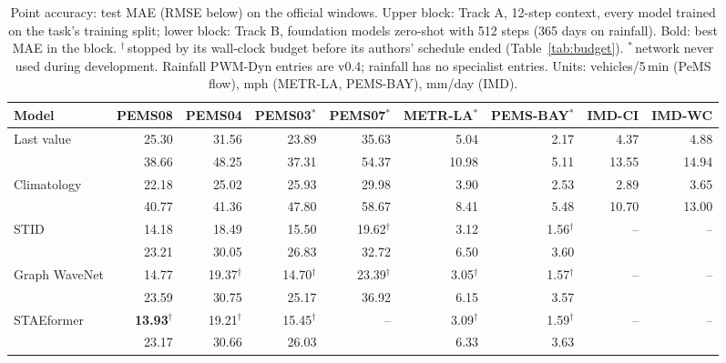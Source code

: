 \begin{table}[t]
\caption{Point accuracy: test MAE (RMSE below) on the official windows. Upper block: Track A, 12-step context, every model trained on the task's training split; lower block: Track B, foundation models zero-shot with 512 steps (365 days on rainfall). Bold: best MAE in the block. $^\dagger$\,stopped by its wall-clock budget before its authors' schedule ended (Table~\ref{tab:budget}). $^\ast$\,network never used during development. Rainfall PWM-Dyn entries are v0.4; rainfall has no specialist entries. Units: vehicles/5\,min (PeMS flow), mph (METR-LA, PEMS-BAY), mm/day (IMD).}
\label{tab:main}
\small
\setlength{\tabcolsep}{4pt}
\begin{tabular}{@{}lrrrrrrrr@{}}
\toprule
Model & PEMS08 & PEMS04 & PEMS03$^\ast$ & PEMS07$^\ast$ & METR-LA$^\ast$ & PEMS-BAY$^\ast$ & IMD-CI & IMD-WC \\
\midrule
Last value & 25.30 & 31.56 & 23.89 & 35.63 & 5.04 & 2.17 & 4.37 & 4.88 \\
 & {\scriptsize 38.66} & {\scriptsize 48.25} & {\scriptsize 37.31} & {\scriptsize 54.37} & {\scriptsize 10.98} & {\scriptsize 5.11} & {\scriptsize 13.55} & {\scriptsize 14.94} \\[1pt]
Climatology & 22.18 & 25.02 & 25.93 & 29.98 & 3.90 & 2.53 & 2.89 & 3.65 \\
 & {\scriptsize 40.77} & {\scriptsize 41.36} & {\scriptsize 47.80} & {\scriptsize 58.67} & {\scriptsize 8.41} & {\scriptsize 5.48} & {\scriptsize 10.70} & {\scriptsize 13.00} \\[1pt]
\midrule
STID & 14.18 & 18.49 & 15.50 & 19.62$^\dagger$ & 3.12 & 1.56$^\dagger$ & -- & -- \\
 & {\scriptsize 23.21} & {\scriptsize 30.05} & {\scriptsize 26.83} & {\scriptsize 32.72} & {\scriptsize 6.50} & {\scriptsize 3.60} &  &  \\[1pt]
Graph WaveNet & 14.77 & 19.37$^\dagger$ & 14.70$^\dagger$ & 23.39$^\dagger$ & 3.05$^\dagger$ & 1.57$^\dagger$ & -- & -- \\
 & {\scriptsize 23.59} & {\scriptsize 30.75} & {\scriptsize 25.17} & {\scriptsize 36.92} & {\scriptsize 6.15} & {\scriptsize 3.57} &  &  \\[1pt]
STAEformer & \textbf{13.93}$^\dagger$ & 19.21$^\dagger$ & 15.45$^\dagger$ & -- & 3.09$^\dagger$ & 1.59$^\dagger$ & -- & -- \\
 & {\scriptsize 23.17} & {\scriptsize 30.66} & {\scriptsize 26.03} &  & {\scriptsize 6.33} & {\scriptsize 3.63} &  &  \\[1pt]

\end{tabular}
\end{table}

